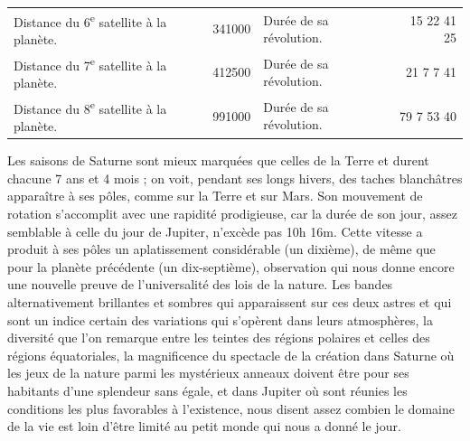 \documentclass[a4paper, 11pt, oneside]{article}
\begin{document}
{\begin{table}[H]
\begin{tabular}{p{35mm} r p{30mm} r}
        Distance du 6\textsuperscript{e} satellite à la planète. & 341000 & Durée de sa révolution. & 15 22 41 25   \\
        Distance du 7\textsuperscript{e} satellite à la planète. & 412500 & Durée de sa révolution. & 21 7 7 41   \\
        Distance du 8\textsuperscript{e} satellite à la planète. & 991000 & Durée de sa révolution. & 79 7 53 40 \\
    \end{tabular}
\end{table}} Les saisons de Saturne sont mieux marquées que celles de la Terre et durent chacune 7 ans et 4 mois ; on voit, pendant ses longs hivers, des taches blanchâtres apparaître à ses pôles, comme sur la Terre et sur Mars. Son mouvement de rotation s'accomplit avec une rapidité prodigieuse, car la durée de son jour, assez semblable à celle du jour de Jupiter, n'excède pas 10h 16m. Cette vitesse a produit à ses pôles un aplatissement considérable (un dixième), de même que pour la planète précédente (un dix-septième), observation qui nous donne encore une nouvelle preuve de l'universalité des lois de la nature. Les bandes alternativement brillantes et sombres qui apparaissent sur ces deux astres et qui sont un indice certain des variations qui s'opèrent dans leurs atmosphères, la diversité que l'on remarque entre les teintes des régions polaires et celles des régions équatoriales, la magnificence du spectacle de la création dans Saturne où les jeux de la nature parmi les mystérieux anneaux doivent être pour ses habitants d'une splendeur sans égale, et dans Jupiter où sont réunies les conditions les plus favorables à l'existence, nous disent assez combien le domaine de la vie est loin d'être limité au petit monde qui nous a donné le jour.
\end{document}
